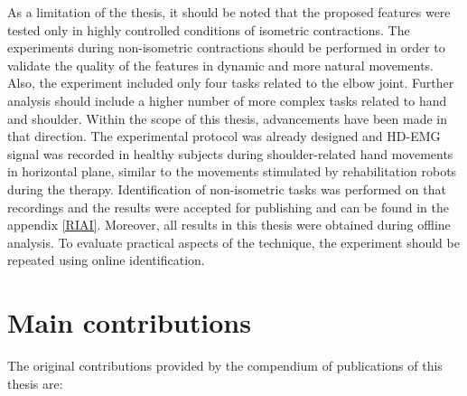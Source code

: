 As a limitation of the thesis, it should be noted that the proposed features were tested only in highly controlled conditions of isometric contractions. The experiments during non-isometric contractions should be performed in order to validate the quality of the features in dynamic and more natural movements. Also, the experiment included only four tasks related to the elbow joint. Further analysis should include a higher number of more complex tasks related to hand and shoulder. Within the scope of this thesis, advancements have been made in that direction. The experimental protocol was already designed and HD-EMG signal was recorded in healthy subjects during shoulder-related hand movements in horizontal plane, similar to the movements stimulated by rehabilitation robots during the therapy. Identification of non-isometric tasks was performed on that recordings and the results were accepted for publishing \citep{Rojas-Martinez2017} and can be found in the appendix \ref{RIAI}. Moreover, all results in this thesis were obtained during offline analysis. To evaluate practical aspects of the technique, the experiment should be repeated using online identification.


\section{Main contributions}

The original contributions provided by the compendium of publications of this thesis are:

